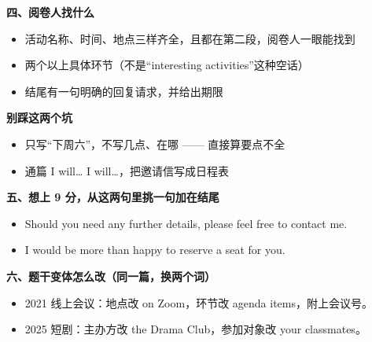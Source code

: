 \documentclass[11pt,a4paper]{ctexart}
\begin{document}
\vspace{5pt}
\noindent\begin{minipage}[t]{0.555\linewidth}
{\color{accent}\bfseries 四、阅卷人找什么}\par
{\footnotesize\begin{itemize}[leftmargin=1.2em,itemsep=1pt,topsep=1pt,parsep=0pt]\setlength{\leftmargin}{1.1em}
\item 活动名称、时间、地点三样齐全，且都在第二段，阅卷人一眼能找到
\item 两个以上具体环节（不是“interesting activities”这种空话）
\item 结尾有一句明确的回复请求，并给出期限
\end{itemize}}
\end{minipage}\hfill
\begin{minipage}[t]{0.415\linewidth}
{\color{hot}\bfseries 别踩这两个坑}\par
{\footnotesize\begin{itemize}[leftmargin=1.2em,itemsep=1pt,topsep=1pt,parsep=0pt]\setlength{\leftmargin}{1.1em}
\item 只写“下周六”，不写几点、在哪 —— 直接算要点不全
\item 通篇 I will… I will…，把邀请信写成日程表
\end{itemize}}
\end{minipage}\par

\vspace{6pt}
{\color{accent}\bfseries 五、想上 9 分，从这两句里挑一句加在结尾}\par
\vspace{2pt}
{\footnotesize
\begin{itemize}[leftmargin=1.2em,itemsep=1.5pt,topsep=1pt,parsep=0pt]
\item Should you need any further details, please feel free to contact me.
\item I would be more than happy to reserve a seat for you.
\end{itemize}}\par

\vspace{6pt}
{\color{accent}\bfseries 六、题干变体怎么改（同一篇，换两个词）}\par
\vspace{2pt}
{\footnotesize
\begin{itemize}[leftmargin=1.2em,itemsep=1.5pt,topsep=1pt,parsep=0pt]
\item 2021 线上会议：地点改 on Zoom，环节改 agenda items，附上会议号。
\item 2025 短剧：主办方改 the Drama Club，参加对象改 your classmates。
\end{itemize}}\par
\end{document}
